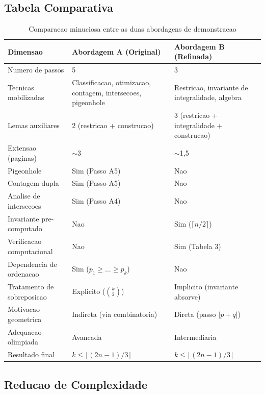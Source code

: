 \documentclass[5p]{elsarticle}
\theoremstyle{definition}
\begin{document}
\subsection{Tabela Comparativa}

\begin{table}[H]
  \centering
  \caption{Comparacao minuciosa entre as duas abordagens de demonstracao}
  \label{tab:diff}
  \begin{tabular}{p{3.5cm}p{5cm}p{5cm}}
    \toprule
    \textbf{Dimensao} & \textbf{Abordagem A (Original)} & \textbf{Abordagem B (Refinada)} \\
    \midrule
    Numero de passos & 5 & 3 \\
    \hline
    Tecnicas mobilizadas & Classificacao, otimizacao, contagem, intersecoes, pigeonhole & Restricao, invariante de integralidade, algebra \\
    \hline
    Lemas auxiliares & 2 (restricao + construcao) & 3 (restricao + integralidade + construcao) \\
    \hline
    Extensao (paginas) & $\sim$3 & $\sim$1,5 \\
    \hline
    Pigeonhole & Sim (Passo A5) & Nao \\
    \hline
    Contagem dupla & Sim (Passo A5) & Nao \\
    \hline
    Analise de intersecoes & Sim (Passo A4) & Nao \\
    \hline
    Invariante pre-computado & Nao & Sim ($\lceil n/2 \rceil$) \\
    \hline
    Verificacao computacional & Nao & Sim (Tabela 3) \\
    \hline
    Dependencia de ordenacao & Sim ($p_1 \geq \dots \geq p_k$) & Nao \\
    \hline
    Tratamento de sobreposicao & Explicito ($\binom{k}{2}$) & Implicito (invariante absorve) \\
    \hline
    Motivacao geometrica & Indireta (via combinatoria) & Direta (passo $|p+q|$) \\
    \hline
    Adequacao olimpiada & Avancada & Intermediaria \\
    \hline
    Resultado final & $k \leq \lfloor(2n-1)/3\rfloor$ & $k \leq \lfloor(2n-1)/3\rfloor$ \\
    \bottomrule
  \end{tabular}
\end{table}

\subsection{Reducao de Complexidade}
\end{document}
